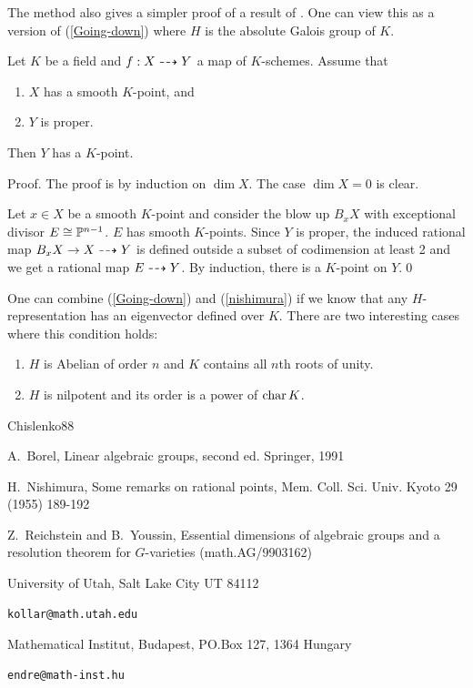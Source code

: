 The method   also gives a simpler proof of a result
of \cite{nishi}. One can view this as a version of
(\ref{Going-down}) where $H$ is the absolute Galois group of $K$.


\begin{prop}\label{nishimura}
  Let $K$ be a 
field  and $f:X\dasharrow Y$ a 
map of
$K$-schemes. Assume that
\begin{enumerate}
\item $X$ has a smooth $K$-point, and
\item $Y$ is proper.
\end{enumerate}
\noindent Then $Y$ has a   $K$-point.
\end{prop}

Proof. The proof is by induction on $\dim X$. The  case  $\dim
X=0$ is clear.

Let $x\in X$ be a smooth $K$-point and consider the blow up
$B_xX$ with exceptional divisor $E\cong {\mathbb P}^{n-1}$. 
$E$ has smooth $K$-points.
 Since $Y$ is
proper, the induced rational map $B_xX\to X\dasharrow Y$ is defined
outside a subset of codimension at least 2 and we get a rational
map $E\dasharrow Y$. By induction, there is a  $K$-point on $Y$.\qed


\begin{rem}  One can combine (\ref{Going-down}) and 
(\ref{nishimura}) if we know that any $H$-representation has an
eigenvector defined over $K$. There are two interesting cases
where this condition holds:
\begin{enumerate}
\item  $H$ is Abelian of order $n$ and $K$ contains all $n$th
roots of unity.
\item $H$ is nilpotent and its order is a power of $\operatorname{char} K$.
\end{enumerate}
\end{rem}


\begin{thebibliography}{Chislenko88}

  A.\ Borel, Linear algebraic groups,
second ed. Springer, 1991


 H.\ Nishimura, Some remarks on
rational points, Mem. Coll. Sci. Univ. Kyoto  29 (1955)
189-192 


 Z.\ Reichstein and B.\
Youssin, Essential dimensions of algebraic groups and a resolution
theorem for $G$-varieties (math.AG/9903162)


\end{thebibliography}

\vskip1cm

\noindent University of Utah, Salt Lake City UT 84112 

\begin{verbatim}kollar@math.utah.edu\end{verbatim}


\noindent Mathematical Institut, Budapest, PO.Box 127, 1364 Hungary

\begin{verbatim}endre@math-inst.hu\end{verbatim}






